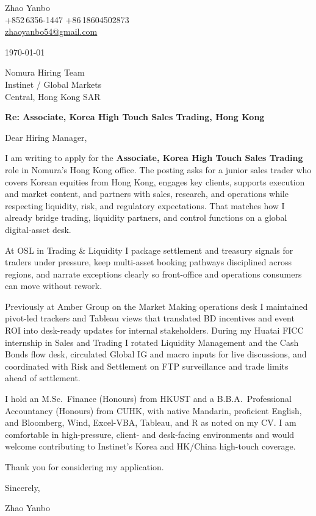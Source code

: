 \documentclass[10pt,a4paper]{article}
\begin{document}
\begin{flushleft}
  Zhao Yanbo\\
  +852\,6356-1447 \;\textbar\; +86\,18604502873\\
  \href{mailto:zhaoyanbo54@gmail.com}{zhaoyanbo54@gmail.com}
\end{flushleft}

\vspace{1em}

\begin{flushright}
  \today
\end{flushright}

\vspace{0.75em}

Nomura Hiring Team\\
Instinet / Global Markets\\
Central, Hong Kong SAR

\vspace{1em}

\textbf{Re: Associate, Korea High Touch Sales Trading, Hong Kong}

\vspace{0.75em}

Dear Hiring Manager,

I am writing to apply for the \textbf{Associate, Korea High Touch Sales Trading} role in Nomura's Hong Kong office. The posting asks for a junior sales trader who covers Korean equities from Hong Kong, engages key clients, supports execution and market content, and partners with sales, research, and operations while respecting liquidity, risk, and regulatory expectations. That matches how I already bridge trading, liquidity partners, and control functions on a global digital-asset desk.

At OSL in Trading \& Liquidity I package settlement and treasury signals for traders under pressure, keep multi-asset booking pathways disciplined across regions, and narrate exceptions clearly so front-office and operations consumers can move without rework.

Previously at Amber Group on the Market Making operations desk I maintained pivot-led trackers and Tableau views that translated BD incentives and event ROI into desk-ready updates for internal stakeholders. During my Huatai FICC internship in Sales and Trading I rotated Liquidity Management and the Cash Bonds flow desk, circulated Global IG and macro inputs for live discussions, and coordinated with Risk and Settlement on FTP surveillance and trade limits ahead of settlement.

I hold an M.Sc.\ Finance (Honours) from HKUST and a B.B.A.\ Professional Accountancy (Honours) from CUHK, with native Mandarin, proficient English, and Bloomberg, Wind, Excel-VBA, Tableau, and R as noted on my CV. I am comfortable in high-pressure, client- and desk-facing environments and would welcome contributing to Instinet's Korea and HK/China high-touch coverage.

Thank you for considering my application.

\vspace{1em}

Sincerely,

\vspace{2em}

Zhao Yanbo
\end{document}
